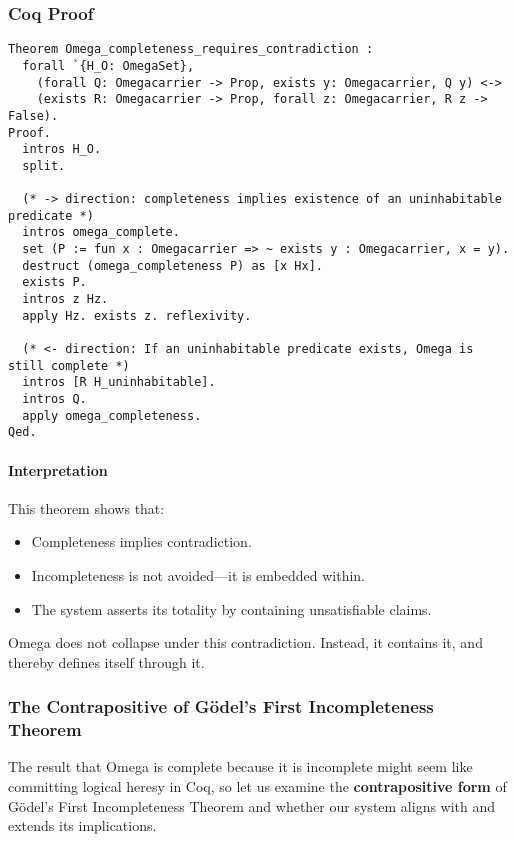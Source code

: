 \documentclass[12pt]{article}
\begin{document}
\subsubsection{Coq Proof}

\begin{lstlisting}[language=Coq]
Theorem Omega_completeness_requires_contradiction :
  forall `{H_O: OmegaSet},
    (forall Q: Omegacarrier -> Prop, exists y: Omegacarrier, Q y) <->
    (exists R: Omegacarrier -> Prop, forall z: Omegacarrier, R z -> False).
Proof.
  intros H_O.
  split.

  (* -> direction: completeness implies existence of an uninhabitable predicate *)
  intros omega_complete.
  set (P := fun x : Omegacarrier => ~ exists y : Omegacarrier, x = y).
  destruct (omega_completeness P) as [x Hx].
  exists P.
  intros z Hz.
  apply Hz. exists z. reflexivity.

  (* <- direction: If an uninhabitable predicate exists, Omega is still complete *)
  intros [R H_uninhabitable].
  intros Q.
  apply omega_completeness.
Qed.
\end{lstlisting}

\paragraph{Interpretation}

This theorem shows that:
\begin{itemize}
  \item Completeness implies contradiction.
  \item Incompleteness is not avoided—it is embedded within.
  \item The system asserts its totality by containing unsatisfiable claims.
\end{itemize}

Omega does not collapse under this contradiction.  
Instead, it contains it, and thereby defines itself through it.

\subsubsection{The Contrapositive of Gödel's First Incompleteness Theorem}

The result that Omega is complete because it is incomplete might seem like committing logical heresy in Coq, so let us examine the \textbf{contrapositive form} of Gödel’s First Incompleteness Theorem and whether our system aligns with and extends its implications.
\end{document}
